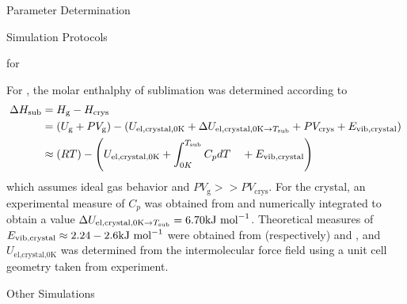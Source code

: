 \begin{subsection}{Parameter Determination}
\end{subsection}

\begin{subsection}{Simulation Protocols}



\begin{subsubsection}{\deltahsub for \co}

For \co, the molar enthalphy of sublimation was determined according to 
%
\begin{align}
\begin{split}
\Delta H_{\text{sub}} &= H_{\text{g}} - H_{\text{crys}}  \\
           &= (U_{\text g} + PV_{\text g}) - (U_{\text{el,crystal,0K}} 
                +\Delta U_{\text{el,crystal,0K}\to T_{\text{sub}}} + PV_{\text{crys}} + E_{\text{vib,crystal}}) \\
           &\approx (RT) - \left(U_{\text{el,crystal,0K}} 
                + \int_{0K}^{T_\text{sub}} C_p dT \quad + E_{\text{vib,crystal}}\right) \\
\end{split}
\end{align}
%
which assumes ideal gas behavior and $PV_{\text{g}} >> PV_{\text{crys}}$.
For the crystal, an experimental measure of $C_p$ was obtained from  and numerically
integrated to obtain a value $\Delta U_{\text{el,crystal,0K}\to
T_{\text{sub}}} = 6.70 \text{kJ mol}^{-1}$. Theoretical measures of
$E_{\text{vib,crystal}} \approx 2.24 - 2.6 \text{kJ mol}^{-1}$ were obtained from
(respectively)  and , 
and
$U_{\text{el,crystal,0K}}$ was determined from the intermolecular force field
using a unit cell geometry taken from experiment.\cite{Simon1980}

\end{subsubsection}
\begin{subsubsection}{Other \co Simulations}


\end{subsubsection}
\end{subsection}
